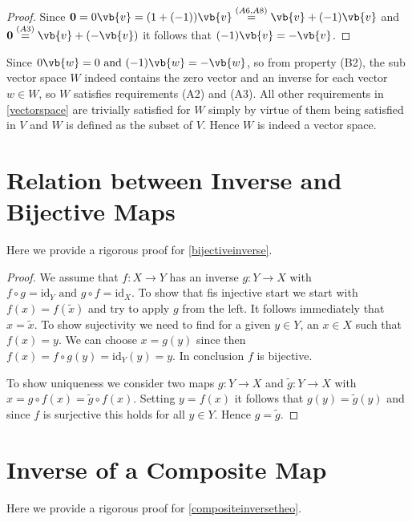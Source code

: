\documentclass[a4paper,12pt]{report}
\begin{document}
\begin{appendices}
\begin{proof}
        Since \(\boldsymbol{0} = 0\vb{v} = (1+(-1))\vb{v} \stackrel{(A6,A8)}{=} \vb{v} + (-1)\vb{v} \) and \(\boldsymbol{0} \stackrel{(A3)}{=} \vb{v} +(-\vb{v} ) \) it follows that \((-1)\vb{v} =-\vb{v} \).  
\end{proof}

Since \(0\vb{w} =0 \text { and } (-1)\vb{w} =-\vb{w} \), so from property (B2), the sub vector space \(W\) indeed contains the zero vector and an inverse for each vector \(w \in  W\), so \(W\) satisfies requirements (A2) and (A3). All other requirements in \cref{vectorspace} are trivially satisfied for \(W\) simply by virtue of them being satisfied in \(V\) and \(W\) is defined as the subset of \(V\). Hence \(W\) is indeed a vector space.    

\section{Relation between Inverse and Bijective Maps} \label{bijectiveinverseapp} 

Here we provide a rigorous proof for \cref{bijectiveinverse}.

\begin{proof}
    We assume that \(f:X \rightarrow Y\) has an inverse \(g:Y \rightarrow X\) with \(f \circ g = \mathrm{id}_{Y} \text { and } g \circ f = \mathrm{id}_{X}  \). To show that fis injective start we start with \(f(x) = f(\tilde{x} )\) and try to apply \(g\) from the left. It follows immediately that \(x=\tilde{x} \). To show sujectivity we need to find for a given \(y \in  Y\), an \(x \in  X\) such that \(f(x) = y\). We can choose \(x = g(y)\) since then \(f(x) = f \circ g(y) = \mathrm{id}_{Y}(y)  = y \). In conclusion \(f\) is bijective.
    
    To show uniqueness we consider two maps \(g:Y \rightarrow X\) and \(\tilde{g} : Y \rightarrow X\) with \(x= g \circ f(x) = \tilde{g} \circ f(x)\). Setting \(y = f(x)\) it follows that \(g(y) = \tilde{g} (y)\) and since \(f\) is surjective this holds for all \(y \in  Y\). Hence \(g=\tilde{g} \).       
\end{proof}

\section{Inverse of a Composite Map} \label{compositeinverseapp} 

Here we provide a rigorous proof for \cref{compositeinversetheo}.


\end{appendices}
\end{document}
